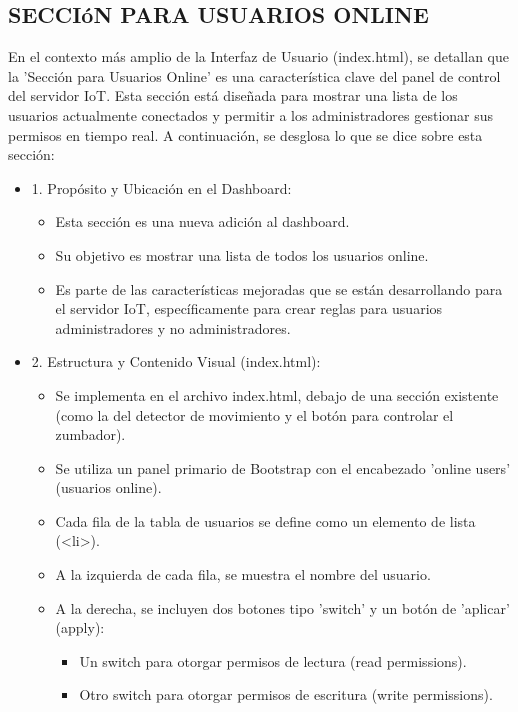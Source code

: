 \documentclass{report}
\begin{document}
\subsection{SECCIóN PARA USUARIOS ONLINE}
En el contexto más amplio de la Interfaz de Usuario (index.html), se  detallan que la 'Sección para Usuarios Online' es una 
característica clave del panel de control del servidor IoT. Esta sección está diseñada para mostrar una lista de los usuarios actualmente 
conectados y permitir a los administradores gestionar sus permisos en tiempo real.
A continuación, se desglosa lo que se  dice sobre esta sección:
\begin{itemize}
    \item 1. Propósito y Ubicación en el Dashboard:
        \begin{itemize}
            \item Esta sección es una nueva adición al dashboard.
            \item Su objetivo es mostrar una lista de todos los usuarios online.
            \item Es parte de las características mejoradas que se están desarrollando para el servidor IoT, específicamente para crear reglas para 
            usuarios administradores y no administradores.
        \end{itemize}
    \item 2. Estructura y Contenido Visual (index.html):
        \begin{itemize}
            \item Se implementa en el archivo index.html, debajo de una sección existente (como la del detector de movimiento y el botón para 
            controlar el zumbador).
            \item Se utiliza un panel primario de Bootstrap con el encabezado 'online users' (usuarios online).
            \item Cada fila de la tabla de usuarios se define como un elemento de lista (<li>).
            \item A la izquierda de cada fila, se muestra el nombre del usuario.
            \item A la derecha, se incluyen dos botones tipo 'switch' y un botón de 'aplicar' (apply):
                \begin{itemize}
                    \item Un switch para otorgar permisos de lectura (read permissions).
                    \item Otro switch para otorgar permisos de escritura (write permissions).

\end{itemize}
\end{itemize}
\end{itemize}
\end{document}
